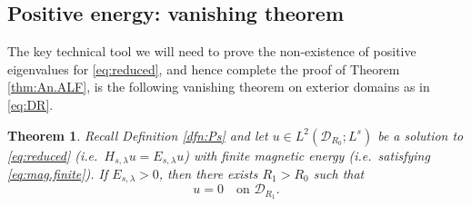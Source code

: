\documentclass{article}
\newtheorem{thm}{Theorem}
\theoremstyle{definition}
\numberwithin{thm}{section}
\numberwithin{equation}{section}
\begin{document}
\subsection{Positive energy: vanishing theorem}

The key technical tool we will need to prove the non-existence of positive eigenvalues for \eqref{eq:reduced}, and hence complete the proof of Theorem \ref{thm:An.ALF}, is the following vanishing theorem on exterior domains as in \eqref{eq:DR}.

\begin{thm}\label{thm:An.vanish}
 Recall Definition \ref{dfn:Ps} and let $u\in L^2(\mathcal{D}_{R_0};L^s)$ be a solution to \eqref{eq:reduced} (i.e.~$H_{s,\lambda}u=E_{s,\lambda}u$) with finite  magnetic energy (i.e.~satisfying \eqref{eq:mag.finite}).  
If $E_{s,\lambda}>0$, then there exists $R_1>R_0$ such that
\begin{equation}
        u=0\quad\text{on }\mathcal{D}_{R_1}.
\end{equation}   
\end{thm}
\end{document}
